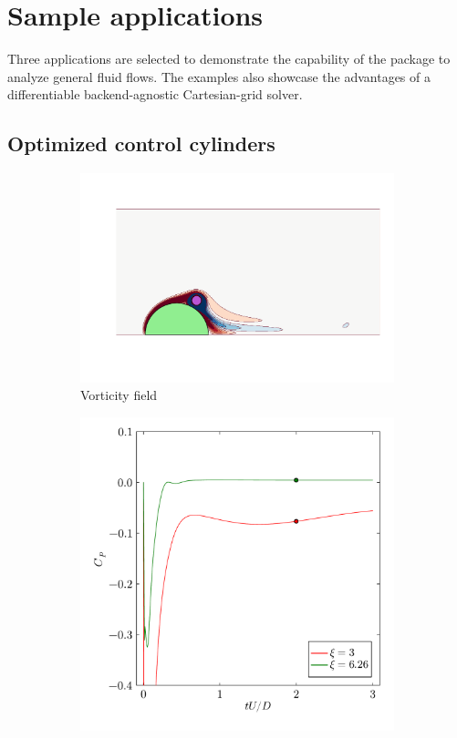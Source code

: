\documentclass[10pt,a4paper]{article}
\begin{document}
\section{Sample applications}\label{sec:applications}
Three applications are selected to demonstrate the capability of the package to analyze general fluid flows. The examples also showcase the advantages of a differentiable backend-agnostic Cartesian-grid solver.

\subsection{Optimized control cylinders}

\begin{figure}
    \centering
    \begin{subfigure}[t]{0.8\linewidth}
        \centering
        \includegraphics[width=\linewidth,trim={50 70 20 210},clip]{img/SpinCylFlood.pdf}
        \vspace{-1cm}
        \caption{Vorticity field}
    \end{subfigure}
    \begin{subfigure}[b]{0.38\linewidth}
        \includegraphics[width=\linewidth]{img/SpinCylHist.pdf}

\end{subfigure}
\end{figure}
\end{document}

